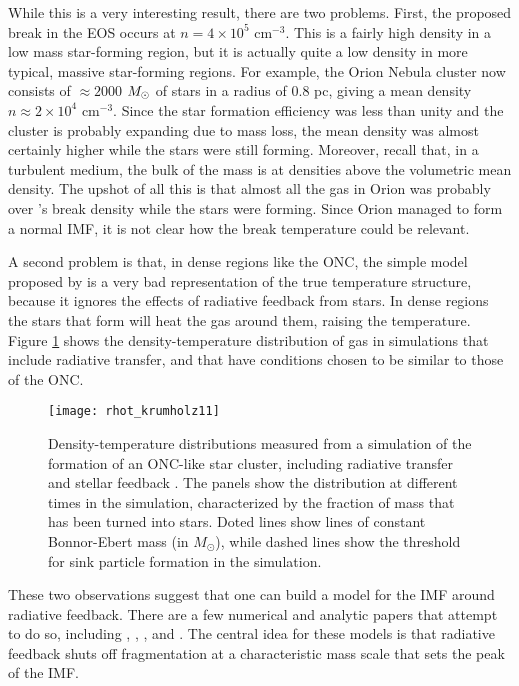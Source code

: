 While this is a very interesting result, there are two problems. First, the proposed break in the EOS occurs at $n=4\times 10^5$ cm$^{-3}$. This is a fairly high density in a low mass star-forming region, but it is actually quite a low density in more typical, massive star-forming regions. For example, the Orion Nebula cluster now consists of $\approx 2000$ $M_{\odot}$ of stars in a radius of $0.8$ pc, giving a mean density $n\approx 2\times 10^4$ cm$^{-3}$. Since the star formation efficiency was less than unity and the cluster is probably expanding due to mass loss, the mean density was almost certainly higher while the stars were still forming. Moreover, recall that, in a turbulent medium, the bulk of the mass is at densities above the volumetric mean density. The upshot of all this is that almost all the gas in Orion was probably over \citet{larson05a}'s break density while the stars were forming. Since Orion managed to form a normal IMF, it is not clear how the break temperature could be relevant.

A second problem is that, in dense regions like the ONC, the simple model proposed by \citet{larson05a} is a very bad representation of the true temperature structure, because it ignores the effects of radiative feedback from stars. In dense regions the stars that form will heat the gas around them, raising the temperature. Figure \ref{fig:rhot_krumholz11} shows the density-temperature distribution of gas in simulations that include radiative transfer, and that have conditions chosen to be similar to those of the ONC.

\begin{figure}
\texttt{[image: rhot\_krumholz11]}
\caption[Density-temperature distribution from a simulation of the formation of the ONC]{
\label{fig:rhot_krumholz11}
Density-temperature distributions measured from a simulation of the formation of an ONC-like star cluster, including radiative transfer and stellar feedback \citep{krumholz11c}. The panels show the distribution at different times in the simulation, characterized by the fraction of mass that has been turned into stars. Doted lines show lines of constant Bonnor-Ebert mass (in $M_\odot$), while dashed lines show the threshold for sink particle formation in the simulation.
}
\end{figure}

These two observations suggest that one can build a model for the IMF around radiative feedback. There are a few numerical and analytic papers that attempt to do so, including \citet{bate09a, bate12a}, \citet{krumholz11e}, \citet{krumholz12b}, and \citet{guszejnov16a}. The central idea for these models is that radiative feedback shuts off fragmentation at a characteristic mass scale that sets the peak of the IMF.

